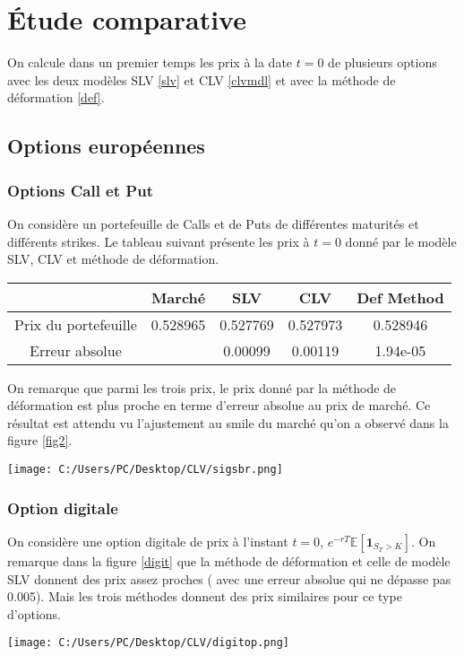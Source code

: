 \documentclass[a4paper,12pt]{report}
\numberwithin{equation}{section}
\theoremstyle{definition}
\numberwithin{equation}{section}
\begin{document}
\section{Étude comparative}
On calcule dans un premier temps les prix à la date $t=0$ de plusieurs options avec les deux modèles SLV \ref{slv} et CLV \ref{clvmdl} et avec la méthode de déformation \ref{def}.
\subsection{Options européennes}
\subsubsection{Options Call et Put}
On considère un portefeuille de Calls et de Puts de différentes maturités et différents strikes. Le tableau suivant présente les prix à $t=0$ donné par le modèle SLV, CLV et méthode de
\vspace*{0.2cm} déformation.\begin{center}
\begin{tabular}{|c|c|c|c|c|}
\hline
 & Marché & SLV & CLV & Def Method \\
 \hline
Prix du portefeuille & 0.528965 & 0.527769 & 0.527973 &0.528946\\
\hline
Erreur absolue & & 0.00099 & 0.00119 & 1.94e-05\\
\hline
\end{tabular}
\end{center}
On remarque que parmi les trois prix, le prix donné par la méthode de déformation est plus proche en terme d'erreur absolue au prix de marché. Ce résultat est attendu vu l'ajustement au smile du marché qu'on a observé dans la figure \ref{fig2}. 
\begin{center}
\texttt{[image: C:/Users/PC/Desktop/CLV/sigsbr.png]}
\label{figmdl}
\end{center}
\subsubsection{Option digitale}
On considère une option digitale de prix à l'instant $t=0$,
$e^{-rT}\mathbb{E}\left[ \textbf{1}_{S_T > K} \right]$. On remarque dans la figure \ref{digit} que la méthode de déformation et celle de modèle SLV donnent des prix assez proches ( avec une erreur absolue qui ne dépasse pas 0.005). Mais les trois méthodes donnent des prix similaires pour ce type d'options.
\begin{center}
\label{digit}
\texttt{[image: C:/Users/PC/Desktop/CLV/digitop.png]}
\end{center}
\end{document}
